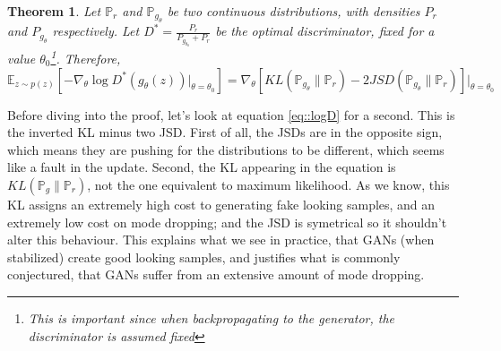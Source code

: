 \documentclass{article} %
\newcommand\EE{\mathbb{E}}
\newcommand\PP{\mathbb{P}}
\newtheorem{theo}{Theorem}[section]
\theoremstyle{definition}
\begin{document}
\begin{theo} Let $\PP_r$ and $\PP_{g_\theta}$ be two continuous distributions, 
with densities $P_r$ and $P_{g_\theta}$ respectively. Let $D^* = \frac{P_r}{P_{g_{\theta_0}} + P_r}$ 
be the optimal discriminator, fixed for a value $\theta_0$\footnote{This is important
since when backpropagating to the generator, the discriminator is assumed fixed}. Therefore,
\begin{equation} \label{eq::logD}
\EE_{z \sim p(z)}\left[-\nabla_\theta \log D^*(g_\theta(z))|_{\theta=\theta_0} \right] =
  \nabla_\theta \left[ KL(\PP_{g_\theta} \| \PP_r) - 2 JSD(\PP_{g_\theta} \| \PP_r)
  \right]|_{\theta=\theta_0}
\end{equation}
\end{theo}
Before diving into the proof, let's look at equation \eqref{eq::logD} for a second.
This is the inverted KL minus two JSD. First of all, the JSDs are in the opposite
sign, which means they are pushing for the distributions to be different, which
seems like a fault in the update. Second, the KL appearing in the equation is
$KL(\PP_g \| \PP_r)$, not the one equivalent to maximum likelihood. As
we know, this KL assigns an extremely high cost to generating fake looking samples,
and an extremely low cost on mode dropping; and the JSD is symetrical so it shouldn't
alter this behaviour. This explains what we see in practice, that GANs (when
stabilized) create good looking samples, and justifies what is commonly conjectured, that
GANs suffer from an extensive amount of mode dropping.
\end{document}
